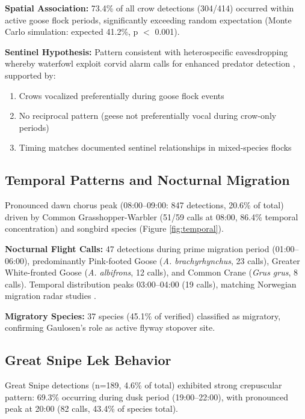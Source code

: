 \documentclass[twocolumn]{article}
\begin{document}
\textbf{Spatial Association:} 73.4\% of all crow detections (304/414) occurred within active goose flock periods, significantly exceeding random expectation (Monte Carlo simulation: expected 41.2\%, p $<$ 0.001).

\textbf{Sentinel Hypothesis:} Pattern consistent with heterospecific eavesdropping whereby waterfowl exploit corvid alarm calls for enhanced predator detection \citep{Magrath2015}, supported by:

\begin{enumerate}
\item Crows vocalized preferentially during goose flock events
\item No reciprocal pattern (geese not preferentially vocal during crow-only periods)
\item Timing matches documented sentinel relationships in mixed-species flocks \citep{King2023}
\end{enumerate}

\subsection{Temporal Patterns and Nocturnal Migration}

Pronounced dawn chorus peak (08:00--09:00: 847 detections, 20.6\% of total) driven by Common Grasshopper-Warbler (51/59 calls at 08:00, 86.4\% temporal concentration) and songbird species (Figure \ref{fig:temporal}).

\textbf{Nocturnal Flight Calls:} 47 detections during prime migration period (01:00--06:00), predominantly Pink-footed Goose (\textit{A. brachyrhynchus}, 23 calls), Greater White-fronted Goose (\textit{A. albifrons}, 12 calls), and Common Crane (\textit{Grus grus}, 8 calls). Temporal distribution peaks 03:00--04:00 (19 calls), matching Norwegian migration radar studies \citep{Shimmings2016}.

\textbf{Migratory Species:} 37 species (45.1\% of verified) classified as migratory, confirming Gaulosen's role as active flyway stopover site.

\subsection{Great Snipe Lek Behavior}

Great Snipe detections (n=189, 4.6\% of total) exhibited strong crepuscular pattern: 69.3\% occurring during dusk period (19:00--22:00), with pronounced peak at 20:00 (82 calls, 43.4\% of species total).
\end{document}

